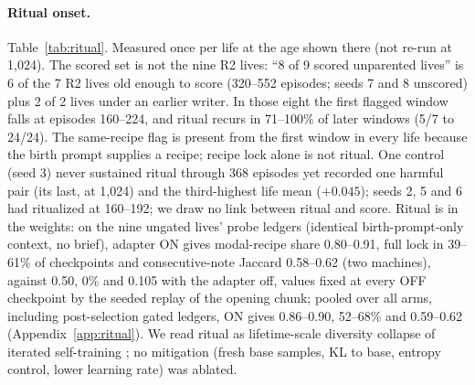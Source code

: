 \documentclass{article}
\begin{document}
\paragraph{Ritual onset.} Table~\ref{tab:ritual}. Measured once per life at the age shown there (not re-run at 1{,}024). The scored set is not the nine R2 lives: ``8 of 9 scored unparented lives'' is 6 of the 7 R2 lives old enough to score (320--552 episodes; seeds 7 and 8 unscored) plus 2 of 2 lives under an earlier writer. In those eight the first flagged window falls at episodes 160--224, and ritual recurs in 71--100\% of later windows (5/7 to 24/24). The same-recipe flag is present from the first window in every life because the birth prompt supplies a recipe; recipe lock alone is not ritual. One control (seed 3) never sustained ritual through 368 episodes yet recorded one harmful pair (its last, at 1{,}024) and the third-highest life mean ($+0.045$); seeds 2, 5 and 6 had ritualized at 160--192; we draw no link between ritual and score. Ritual is in the weights: on the nine ungated lives' probe ledgers (identical birth-prompt-only context, no brief), adapter ON gives modal-recipe share 0.80--0.91, full lock in 39--61\% of checkpoints and consecutive-note Jaccard 0.58--0.62 (two machines), against 0.50, 0\% and 0.105 with the adapter off, values fixed at every OFF checkpoint by the seeded replay of the opening chunk; pooled over all arms, including post-selection gated ledgers, ON gives 0.86--0.90, 52--68\% and 0.59--0.62 (Appendix~\ref{app:ritual}). We read ritual as lifetime-scale diversity collapse of iterated self-training \citep{shumailov2024collapse,alemohammad2023mad}; no mitigation (fresh base samples, KL to base, entropy control, lower learning rate) was ablated.
\end{document}
